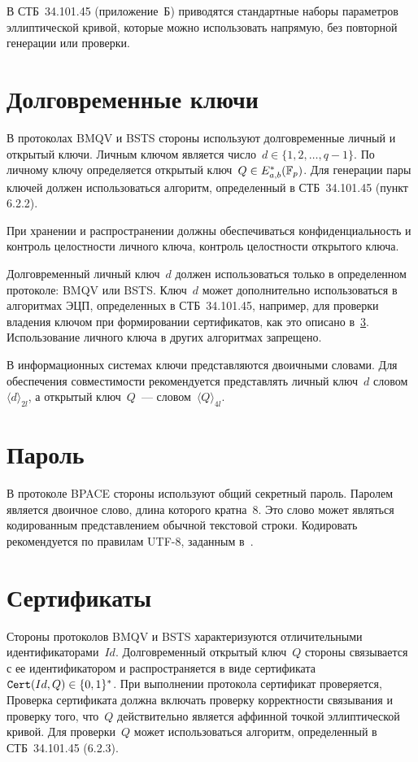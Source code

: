 В СТБ~34.101.45 (приложение~Б) приводятся стандартные 
наборы параметров эллиптической кривой, которые можно использовать 
напрямую, без повторной генерации или проверки.

\section{Долговременные ключи}\label{COMMON.Static}

В протоколах BMQV и BSTS стороны используют долговременные
личный и открытый ключи.
%
Личным ключом является число~$d\in\{1,2,\ldots,q-1\}$.
По личному ключу определяется открытый ключ~$Q\in E_{a,b}^*(\mathbb{F}_p)$.
Для генерации пары ключей должен использоваться алгоритм,
определенный в СТБ~34.101.45 (пункт 6.2.2).

При хранении и распространении
должны обеспечиваться конфиденциальность и контроль целостности личного 
ключа, контроль целостности открытого ключа.

Долговременный личный ключ~$d$ должен использоваться только 
в определенном протоколе: BMQV или BSTS. 
Ключ~$d$ может дополнительно использоваться в алгоритмах ЭЦП, 
определенных в СТБ~34.101.45, например,
для проверки владения ключом 
при формировании сертификатов, как это описано в~\ref{COMMON.Cert}. 
Использование личного ключа в других алгоритмах запрещено.

В информационных системах ключи представляются двоичными словами.
Для обеспечения совместимости рекомендуется представлять
личный ключ~$d$ словом~$\langle d\rangle_{2l}$,
а открытый ключ~$Q$~--- словом~$\langle Q\rangle_{4l}$.

\section{Пароль}\label{COMMON.Pwd}

В протоколе BPACE стороны используют общий секретный пароль.
%
Паролем является двоичное слово, 
длина которого кратна~$8$. Это слово может являться
кодированным представлением обычной текстовой строки. 
Кодировать рекомендуется по правилам UTF-8, 
заданным в~\cite{UTF8}.

\section{Сертификаты}\label{COMMON.Cert}

Стороны протоколов BMQV и BSTS характеризуются отличительными
идентификаторами~$Id$.
%
Долговременный открытый ключ~$Q$ стороны 
связывается с ее идентификатором и распространяется
в виде сертификата~$\texttt{Cert}(Id,Q)\in\{0,1\}^*$.
%
При выполнении протокола сертификат проверяется,
Проверка сертификата должна включать 
проверку корректности связывания
и проверку того, что~$Q$ действительно является аффинной
точкой эллиптической кривой. Для проверки~$Q$ может использоваться
алгоритм, определенный в СТБ~34.101.45 (6.2.3).

